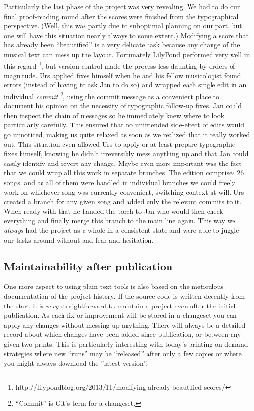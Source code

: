 \documentclass[11pt,a4paper]{article}
\begin{document}
Particularly the last phase of the project was very revealing. We had to do our final
proof-reading round after the scores were finished from the typographical perspective.
(Well, this was partly due to suboptimal planning on our part, but one will have this
situation nearly always to some extent.) Modifying a score that has already been
“beautified” is a very delicate task because any change of the musical text can
mess up the layout. Fortunately LilyPond performed very well in this regard%
\footnote{\url{http://lilypondblog.org/2013/11/modifying-already-beautified-scores/}},
but version control made the process less daunting by orders of magnitude.
Urs applied fixes  himself when he and his fellow musicologist found errors (instead
of having to ask Jan to do so) and wrapped each single edit in an individual \emph{commit}%
\footnote{“Commit” is Git's term for a changeset.},
using the commit message as a convenient place to document his opinion on the necessity of
typographic follow-up fixes. Jan could then inspect the chain of messages so he
immediately knew where to look particularly carefully. This ensured that no unintended
side-effect of edits would go unnoticed, making us quite relaxed as soon as we realized
that it really worked out. This situation even allowed Urs to apply or at least prepare
typographic fixes himself, knowing he didn't irreversibly mess anything up and that Jan
could easily identify and revert any change.
Maybe even more important was the fact that we could wrap all this work in separate branches.
The edition comprises 26 songs, and as all of them were handled in individual branches
we could freely work on whichever song was currently convenient, switching context at
will. Urs created a branch for any given song and added only the relevant commits to it.
When ready with that he handed the torch to Jan who would then check everything and
finally merge this branch to the main line again. This way we \emph{always} had the project
as a whole in a consistent state and were able to juggle our tasks around without and fear
and hesitation.

\subsection{Maintainability after publication}
One more aspect to using plain text tools is also based on the meticulous documentation
of the project history. If the source code is written decently from the start it is
\emph{very} straightforward to maintain a project even after the initial publication.
As each fix or improvement will be stored in a changeset you can apply any changes
without messing up anything. There will always be a detailed record about which
changes have been added since publication, or between any given two prints. This is
particularly interesting with today's printing-on-demand strategies where new “runs”
may be “released” after only a few copies or where you might always download the ”latest
version”.
\end{document}
